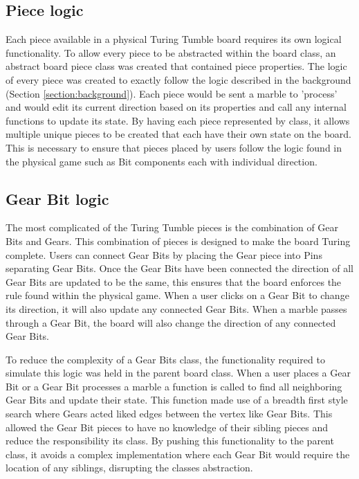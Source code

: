 \documentclass{l4proj}
\begin{document}
\subsection{Piece logic}
Each piece available in a physical Turing Tumble board requires its own logical functionality. To allow every piece to be abstracted within the board class, an abstract board piece class was created that contained piece properties. The logic of every piece was created to exactly follow the logic described in the background (Section \ref{section:background}). Each piece would be sent a marble to 'process' and would edit its current direction based on its properties and call any internal functions to update its state. By having each piece represented by class, it allows multiple unique pieces to be created that each have their own state on the board. This is necessary to ensure that pieces placed by users follow the logic found in the physical game such as Bit components each with individual direction.  


\subsection{Gear Bit logic}
The most complicated of the Turing Tumble pieces is the combination of Gear Bits and Gears. This combination of pieces is designed to make the board Turing complete. Users can connect Gear Bits by placing the Gear piece into Pins separating Gear Bits. Once the Gear Bits have been connected the direction of all Gear Bits are updated to be the same, this ensures that the board enforces the rule found within the physical game. When a user clicks on a Gear Bit to change its direction, it will also update any connected Gear Bits. When a marble passes through a Gear Bit, the board will also change the direction of any connected Gear Bits.

To reduce the complexity of a Gear Bits class, the functionality required to simulate this logic was held in the parent board class. When a user places a Gear Bit or a Gear Bit processes a marble a function is called to find all neighboring Gear Bits and update their state. This function made use of a breadth first style search where Gears acted liked edges between the vertex like Gear Bits. This allowed the Gear Bit pieces to have no knowledge of their sibling pieces and reduce the responsibility its class. By pushing this functionality to the parent class, it avoids a complex implementation where each Gear Bit would require the location of any siblings, disrupting the classes abstraction.
\end{document}
